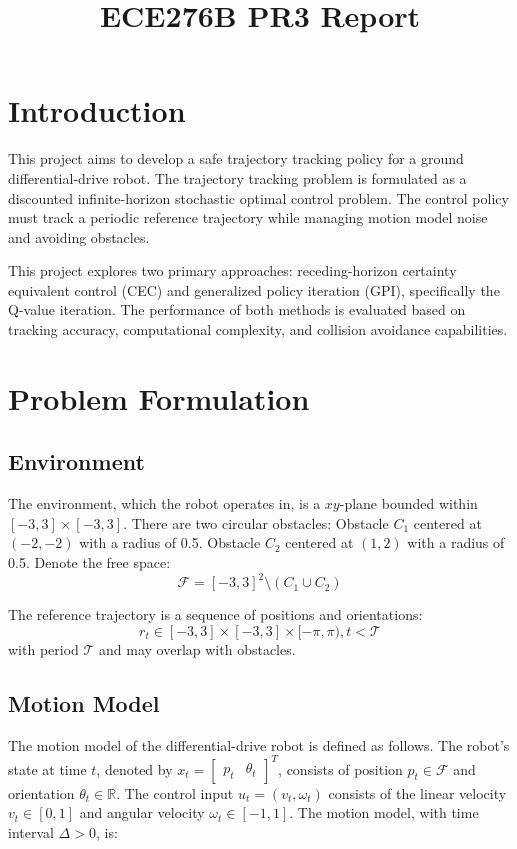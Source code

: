 \documentclass[conference]{IEEEtran}
\begin{document}
\title{ECE276B PR3 Report}

\author{
}

\maketitle

\section{Introduction}
This project aims to develop a safe trajectory tracking policy 
for a ground differential-drive robot.
The trajectory tracking problem is formulated as a 
discounted infinite-horizon stochastic optimal control problem.
The control policy must track a periodic reference trajectory 
while managing motion model noise and avoiding obstacles. 

This project explores two primary approaches: 
receding-horizon certainty equivalent control (CEC) and 
generalized policy iteration (GPI), specifically the Q-value iteration. 
The performance of both methods is evaluated based on 
tracking accuracy, computational complexity, and collision avoidance capabilities.


\section{Problem Formulation}
\subsection{Environment}
The environment, which the robot operates in, is 
a \(xy\)-plane bounded within \([-3, 3] \times [-3, 3]\).
There are two circular obstacles:
Obstacle \( C_1 \) centered at \((-2, -2)\) with a radius of 0.5.
Obstacle \( C_2 \) centered at \((1, 2)\) with a radius of 0.5.
Denote the free space:
\[ \mathcal{F} = [-3, 3]^2 \setminus (C_1 \cup C_2) \]

The reference trajectory is a sequence of positions and orientations:
\[ r_t \in [-3,3] \times [-3,3] \times [-\pi, \pi), t < \mathcal{T}\]
with period $\mathcal{T}$ and may overlap with obstacles.

\subsection{Motion Model}
The motion model of the differential-drive robot is defined as follows. 
The robot's state at time \( t \), denoted by 
\( {x}_t = [\begin{matrix}{p}_t & \theta_t\end{matrix}]^T \), 
consists of position \( {p}_t \in \mathcal{F} \) and orientation \( \theta_t \in \mathbb{R} \). 
The control input \( {u}_t = (v_t, \omega_t) \) 
consists of the linear velocity \( v_t \in [0,1] \) and 
angular velocity \( \omega_t \in [-1,1] \). 
The motion model, with time interval \( \Delta > 0 \), is:
\end{document}
